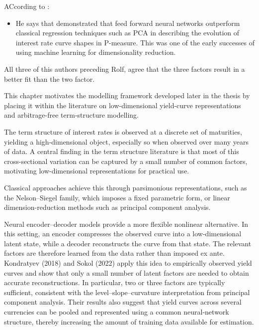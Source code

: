 ACcording to \cite{Sokol2022}:
\begin{itemize}
    \item He says that \cite{Kondratyev2018} demonstrated that feed forward neural networks outperform classical regression techniques such as PCA in describing the evolution of interest rate curve shapes in P-measure. This was one of the early successes of using machine learning for dimensionality reduction.
\end{itemize}





All three of this authors preceding Rolf, agree that the three factors result in a better fit than the two factor.







This chapter motivates the modelling framework developed later in the thesis by placing it within the literature on low-dimensional yield-curve representations and arbitrage-free term-structure modelling. 

The term structure of interest rates is observed at a discrete set of maturities, yielding a high-dimensional object, especially so when observed over many years of data. A central finding in the term structure literature is that most of this cross-sectional variation can be captured by a small number of common factors, motivating low-dimensional representations for practical use.

Classical approaches achieve this through parsimonious representations, such as the Nelson--Siegel family, which imposes a fixed parametric form, or linear dimension-reduction methods such as principal component analysis. 

Neural encoder--decoder models provide a more flexible nonlinear alternative. In this setting, an encoder compresses the observed curve into a low-dimensional latent state, while a decoder reconstructs the curve from that state. The relevant factors are therefore learned from the data rather than imposed ex ante. Kondratyev (2018) and Sokol (2022) apply this idea to empirically observed yield curves and show that only a small number of latent factors are needed to obtain accurate reconstructions. In particular, two or three factors are typically sufficient, consistent with the level--slope--curvature interpretation from principal component analysis. Their results also suggest that yield curves across several currencies can be pooled and represented using a common neural-network structure, thereby increasing the amount of training data available for estimation.

